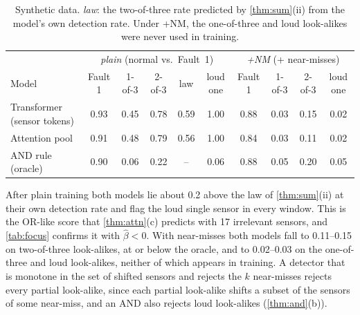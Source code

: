 \begin{table}[h]\centering\small\setlength{\tabcolsep}{3.5pt}
\renewcommand{\arraystretch}{1.15}
\caption{Synthetic data. \emph{law}: the two-of-three rate predicted by \cref{thm:sum}(ii) from the model's own detection rate. Under +NM, the one-of-three and loud look-alikes were never used in training.}\label{tab:toy}
\begin{tabular}{@{}lccccc|cccc@{}}\toprule
 & \multicolumn{5}{c|}{\emph{plain} (normal vs.\ Fault~1)} & \multicolumn{4}{c}{\emph{+NM} (+ near-misses)}\\
Model & Fault 1 & 1-of-3 & 2-of-3 & law & loud one & Fault 1 & 1-of-3 & 2-of-3 & loud one\\\midrule
Transformer (sensor tokens) & 0.93 & 0.45 & 0.78 & 0.59 & 1.00 & 0.88 & 0.03 & 0.15 & 0.02\\
Attention pool & 0.91 & 0.48 & 0.79 & 0.56 & 1.00 & 0.84 & 0.03 & 0.11 & 0.02\\
\midrule
AND rule (oracle) & 0.90 & 0.06 & 0.22 & -- & 0.06 & 0.88 & 0.05 & 0.20 & 0.05\\
\bottomrule\end{tabular}\end{table}

After plain training both models lie about 0.2 above the law of \cref{thm:sum}(ii) at their own detection rate and flag the loud single sensor in every window. This is the OR-like score that \cref{thm:attn}(c) predicts with 17 irrelevant sensors, and \cref{tab:focus} confirms it with $\hat\beta<0$. With near-misses both models fall to 0.11--0.15 on two-of-three look-alikes, at or below the oracle, and to 0.02--0.03 on the one-of-three and loud look-alikes, neither of which appears in training. A detector that is monotone in the set of shifted sensors and rejects the $k$ near-misses rejects every partial look-alike, since each partial look-alike shifts a subset of the sensors of some near-miss, and an AND also rejects loud look-alikes (\cref{thm:and}(b)).

\begin{table}[h]\centering\small
\renewcommand{\arraystretch}{1.15}
\caption{Learned attention of the attention-pool model (mean\,$\pm$\,s.d.\ over 3 seeds). $\hat\beta$: learned inverse temperature; left-out ratio: attention on the unshifted sensor of a two-of-three window relative to the other signature sensors; mass: total attention on the signature sensors. On fan-coil with near-misses the left-out ratio varies over orders of magnitude between seeds, so its minimum is reported.}\label{tab:focus}

\end{table}

